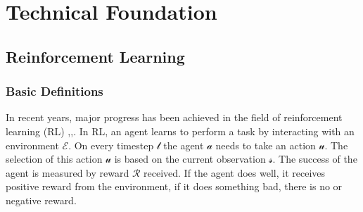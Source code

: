%
%

\chapter{Technical Foundation}\label{chap.grundlagen}
\section{Reinforcement Learning}\label{reinforcementlearning}
\subsection*{Basic Definitions}\label{basic_rl_definitions}
In recent years, major progress has been achieved in the field of reinforcement learning (RL) \cite{mnih2013playing},\cite{alphazero},\cite{hideandseek}.
In RL, an agent learns to perform a task by interacting with an environment $\mathcal{E}$. On every timestep $\mathcal{t}$ the agent $\mathcal{a}$ needs to take an action $\mathcal{u}$. The selection of this action $\mathcal{u}$ is based on the current observation $\mathcal{s}$. The success of the agent is measured by reward $\mathcal{R}$ received. If the agent does well, it receives positive reward from the environment, if it does something bad, there is no or negative reward.

